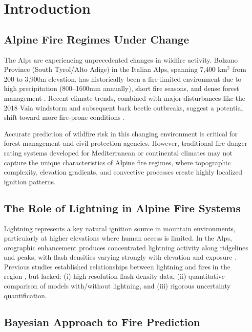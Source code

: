\documentclass[11pt,a4paper]{article}
\begin{document}
\section{Introduction}

\subsection{Alpine Fire Regimes Under Change}

The Alps are experiencing unprecedented changes in wildfire activity. Bolzano Province (South Tyrol/Alto Adige) in the Italian Alps, spanning 7,400 km$^2$ from 200 to 3,900m elevation, has historically been a fire-limited environment due to high precipitation (800--1600mm annually), short fire seasons, and dense forest management \citep{Conedera2018}. Recent climate trends, combined with major disturbances like the 2018 Vaia windstorm and subsequent bark beetle outbreaks, suggest a potential shift toward more fire-prone conditions \citep{Seidl2017}.

Accurate prediction of wildfire risk in this changing environment is critical for forest management and civil protection agencies. However, traditional fire danger rating systems developed for Mediterranean or continental climates may not capture the unique characteristics of Alpine fire regimes, where topographic complexity, elevation gradients, and convective processes create highly localized ignition patterns.

\subsection{The Role of Lightning in Alpine Fire Systems}

Lightning represents a key natural ignition source in mountain environments, particularly at higher elevations where human access is limited. In the Alps, orographic enhancement produces concentrated lightning activity along ridgelines and peaks, with flash densities varying strongly with elevation and exposure \citep{Conedera2006}. Previous studies established relationships between lightning and fires in the region \citep{Conedera2018}, but lacked: (i) high-resolution flash density data, (ii) quantitative comparison of models with/without lightning, and (iii) rigorous uncertainty quantification.

\subsection{Bayesian Approach to Fire Prediction}
\end{document}
